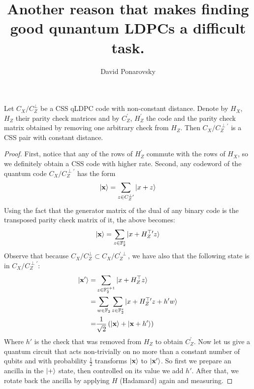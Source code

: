 \documentclass[manuscript,screen,review]{acmart}
\begin{document}


\title{Another reason that makes finding good qunantum LDPCs a difficult task.} 
\author{David Ponarovsky}
  \maketitle
  
  \begin{claim}
Let $C_X/C_Z^{\perp}$ be a CSS qLDPC code with non-constant distance. Denote by $H_X$, $H_Z$ their parity check matrices and by $C_Z^{\prime}$, $H_Z^{\prime}$ the code and the parity check matrix obtained by removing one arbitrary check from $H_Z$. Then $C_X/C_Z^{\perp \prime}$ is a CSS pair with constant distance.
\end{claim}

\begin{proof}
First, notice that any of the rows of $H_Z^{\prime}$ commute with the rows of $H_X$, so we definitely obtain a CSS code with higher rate. Second, any codeword of the quantum code $C_X/C_Z^{\perp \prime}$ has the form  
\begin{equation*}
  \begin{split}
    \ket{\mathbf{x}} = \sum_{z \in C_Z^{\perp \prime}}{\ket{x + z}}
  \end{split}
\end{equation*}
Using the fact that the generator matrix of the dual of any binary code is the transposed parity check matrix of it, the above becomes:
\begin{equation*}
  \begin{split}
    \ket{\mathbf{x}} = \sum_{z \in \mathbb{F}_2^s}{\ket{x + H_Z^{\top \prime}z}}
  \end{split}
\end{equation*}
Observe that because $C_X/C_Z^{\perp} \subset C_X/C_Z^{\prime \perp}$, we have also that the following state is in $C_X/C_Z^{\perp \prime}$:
\begin{equation*}
  \begin{split} 
    \ket{\mathbf{x'}} = & \sum_{z \in \mathbb{F}_2^{s+1}}{\ket{x + H_Z^{\top}z}} \\
    =& \sum_{w \in \mathbb{F}_2}\sum_{z \in \mathbb{F}_2^s}{\ket{x + H_Z^{\top \prime}z + h'w  }} \\ 
    =& \frac{1}{\sqrt{2}}\left( \ket{\mathbf{x}} + \ket{\mathbf{x} + h^{\prime}} \right)
  \end{split}
\end{equation*}
Where $h'$ is the check that was removed from $H_Z$ to obtain $C_Z^{\prime}$. Now let us give a quantum circuit that acts non-trivially on no more than a constant number of qubits and with probability $\frac{1}{2}$ transforms $\ket{\mathbf{x}}$ to $\ket{\mathbf{x'}}$. So first we prepare an ancilla in the $\ket{+}$ state, then controlled on its value we add $h'$. After that, we rotate back the ancilla by applying $H$ (Hadamard) again and measuring.


\end{proof}
\end{document}
